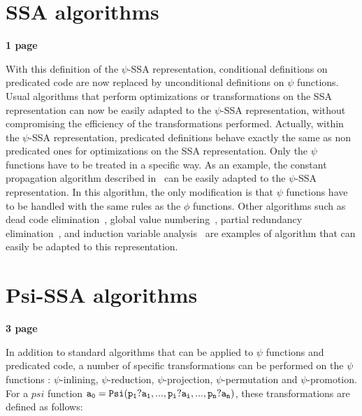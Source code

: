 \section{SSA algorithms}

\textbf{1 page}


With this definition of the $\psi$-SSA representation, conditional
definitions on predicated code are now replaced by unconditional
definitions on $\psi$ functions. Usual algorithms that perform
optimizations or transformations on the SSA representation can now be
easily adapted to the $\psi$-SSA representation, without compromising
the efficiency of the transformations performed. Actually, within the
$\psi$-SSA representation, predicated definitions behave exactly the
same as non predicated ones for optimizations on the SSA
representation. Only the $\psi$ functions have to be treated in a
specific way. As an example, the constant propagation algorithm
described in~\cite{WZ91} can be easily adapted to the $\psi$-SSA
representation. In this algorithm, the only modification is that
$\psi$ functions have to be handled with the same rules as the $\phi$
functions. Other algorithms such as dead code
elimination~\cite{morgan98}, global value numbering~\cite{Cli95},
partial redundancy elimination~\cite{CCK+97}, and induction variable
analysis~\cite{Wolfe92} are examples of algorithm that can easily be
adapted to this representation.

\section{Psi-SSA algorithms}

\textbf{3 page}


In addition to standard algorithms that can be applied to $\psi$
functions and predicated code, a number of specific transformations
can be performed on the $\psi$ functions : $\psi$-inlining,
$\psi$-reduction, $\psi$-projection, $\psi$-permutation and
$\psi$-promotion. For a $psi$ function ${\tt a_0 = Psi(p_1?a_1, ...,
  p_i?a_i, ..., p_n?a_n)}$, these transformations are defined as
follows:

